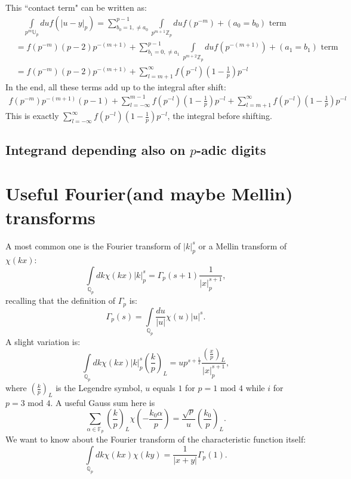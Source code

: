 \documentclass[12pt]{article}
\begin{document}
This ``contact term" can be written as:
\begin{equation}
\begin{aligned}
&\quad\int\limits_{p^m\mathbb{U}_p}du f(|u-y|_p)=\sum\limits_{b_0=1,\neq a_0}^{p-1}\int\limits_{p^{m+1}\mathbb{Z}_p}du f(p^{-m})+(a_0=b_0)\text{ term}\\
&=f(p^{-m})(p-2)p^{-(m+1)}+\sum\limits_{b_1=0,\neq a_1}^{p-1}\int\limits_{p^{m+2}\mathbb{Z}_p}du f(p^{-(m+1)})+(a_1=b_1)\text{ term}\\
&=f(p^{-m})(p-2)p^{-(m+1)}+\sum\limits_{l=m+1}^{\infty}f(p^{-l})(1-\frac{1}{p}) p^{-l}
\end{aligned}
\end{equation}
In the end, all these terms add up to the integral after shift:
\begin{equation}
\begin{aligned}
f(p^{-m})p^{-(m+1)}(p-1)+\sum\limits_{l=-\infty}^{m-1}f(p^{-l})(1-\frac{1}{p})p^{-l}+\sum\limits_{l=m+1}^{\infty}f(p^{-l})(1-\frac{1}{p}) p^{-l}
\end{aligned}
\end{equation}
This is exactly $\sum\limits_{l=-\infty}^{\infty}f(p^{-l})(1-\frac{1}{p})p^{-l}$, the integral before shifting.
\subsection{Integrand depending also on $p$-adic digits}
\section{Useful Fourier(and maybe Mellin) transforms}
A most common one is the Fourier transform of $|k|_p^s$ or a Mellin transform of $\chi(kx)$:
\begin{equation}
\int\limits_{\mathbb{Q}_p} dk \chi(kx)|k|_p^s=\Gamma_p(s+1)\frac{1}{|x|_p^{s+1}},
\end{equation}
recalling that the definition of $\Gamma_p$ is:
\begin{equation}
\Gamma_p(s)=\int\limits_{\mathbb{Q}_p}\frac{du}{|u|}\chi(u)|u|^s.
\end{equation}
A slight variation is:
\begin{equation}
\int\limits_{\mathbb{Q}_p} dk \chi(kx)|k|_p^s\left(\frac{k}{p}\right)_L=up^{s+\frac{1}{2}}\frac{\left(\frac{x}{p}\right)_L}{|x|_p^{s+1}},
\end{equation}
where $\left(\frac{k}{p}\right)_L$ is the Legendre symbol, $u$ equals $1$ for $p=1 \text{ mod } 4$ while $i$ for $p=3 \text{ mod } 4$. A useful Gauss sum here is
\begin{equation}
\sum\limits_{\alpha\in \mathbb{F}_p}\left(\frac{k}{p}\right)_L \chi\left(-\frac{k_0 \alpha}{p}\right)=\frac{\sqrt{p}}{u}\left(\frac{k_0}{p}\right)_L.
\end{equation}
We want to know about the Fourier transform of the characteristic function itself:
\begin{equation}
\int\limits_{\mathbb{Q}_p} dk \chi(kx)\chi(ky)=\frac{1}{|x+y|}\Gamma_p(1).
\end{equation}
\end{document}
